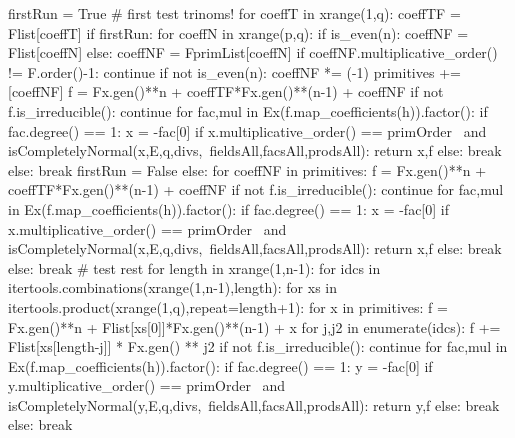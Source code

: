 \begin{sagecode}[caption={[\texttt{findAnyPCN\_polynom} aus 
 \url{../Sage/findAnyPCN_trinom.spyx}]Aus \url{../Sage/findAnyPCN_trinom.spyx}},
  label=lst:findAnyPCN_polynom]
    firstRun = True
    # first test trinoms!
    for coeffT in xrange(1,q):
        coeffTF = Flist[coeffT]
        if firstRun:
            for coeffN in xrange(p,q):
                if is_even(n):
                    coeffNF = Flist[coeffN]
                else:
                    coeffNF = FprimList[coeffN]
                if coeffNF.multiplicative_order() != F.order()-1: continue
                if not is_even(n): coeffNF *= (-1)
                primitives += [coeffNF]
                f = Fx.gen()**n + coeffTF*Fx.gen()**(n-1) + coeffNF
                if not f.is_irreducible(): continue
                for fac,mul in Ex(f.map_coefficients(h)).factor():
                    if fac.degree() == 1:
                        x = -fac[0]
                        if x.multiplicative_order() == primOrder \
                                and isCompletelyNormal(x,E,q,divs,\
                                fieldsAll,facsAll,prodsAll):
                            return x,f
                        else: break
                    else: break
            firstRun = False
        else:
            for coeffNF in primitives:
                f = Fx.gen()**n + coeffTF*Fx.gen()**(n-1) + coeffNF
                if not f.is_irreducible(): continue
                for fac,mul in Ex(f.map_coefficients(h)).factor():
                    if fac.degree() == 1:
                        x = -fac[0]
                        if x.multiplicative_order() == primOrder \
                                and isCompletelyNormal(x,E,q,divs,\
                                fieldsAll,facsAll,prodsAll):
                            return x,f
                        else: break
                    else: break
    # test rest
    for length in xrange(1,n-1):
        for idcs in itertools.combinations(xrange(1,n-1),length):
            for xs in itertools.product(xrange(1,q),repeat=length+1):
                for x in primitives:
                    f = Fx.gen()**n + Flist[xs[0]]*Fx.gen()**(n-1) + x
                    for j,j2 in enumerate(idcs):
                        f += Flist[xs[length-j]] * Fx.gen() ** j2
                    if not f.is_irreducible(): continue
                    for fac,mul in Ex(f.map_coefficients(h)).factor():
                        if fac.degree() == 1:
                            y = -fac[0]
                            if y.multiplicative_order() == primOrder \
                                    and isCompletelyNormal(y,E,q,divs,\
                                    fieldsAll,facsAll,prodsAll):
                                return y,f
                            else: break
                        else: break
\end{sagecode}

